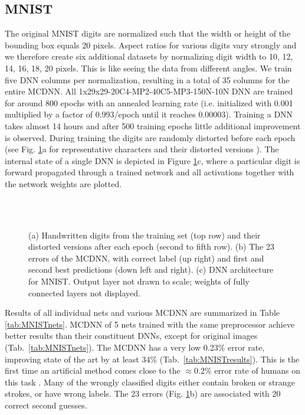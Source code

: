 \documentclass[a4paper]{article}
\begin{document}
\subsection{MNIST}

The original MNIST digits  \cite{lecun:1998} are normalized such that the width or height of the bounding box equals 20 pixels. Aspect ratios for various digits vary strongly and we therefore create six additional datasets by normalizing digit width to 10, 12, 14, 16, 18, 20 pixels. This is like seeing the data from different angles. We train five DNN columns per normalization, resulting in a total of 35 columns for the entire MCDNN. All 1x29x29-20C4-MP2-40C5-MP3-150N-10N DNN are trained for around 800 epochs with an annealed learning rate (i.e. initialized with 0.001 multiplied by a factor of 0.993/epoch until it reaches 0.00003). Training a DNN takes almost 14 hours and after 500 training epochs little additional improvement is observed. During training the digits are randomly distorted before each epoch (see Fig. \ref{fig:MNIST}a for representative characters and their distorted versions \cite{Ciresan:2011a}). The internal state of a single DNN is depicted in Figure \ref{fig:MNIST}c, where a particular digit is forward propagated through a trained network and all activations together with the network weights are plotted.

\begin{figure}[h]
	\centering
	\setlength{\fboxsep}{10pt}
	\setlength{\fboxrule}{0pt}
	\\
	\\
	
\caption{(a) Handwritten digits from the training set (top row) and their distorted versions after each epoch (second to fifth row). (b) The 23 errors of the MCDNN, with correct label (up right) and first and second best predictions (down left and right). (c) DNN architecture for MNIST. Output layer not drawn to scale; weights of fully connected layers not displayed.}
\label{fig:MNIST}
\end{figure}

Results of all individual nets and various MCDNN are summarized in Table \ref{tab:MNISTnets}. MCDNN of 5 nets trained with the same preprocessor achieve better results than their constituent DNNs, except for original images (Tab.~\ref{tab:MNISTnets}). 
The MCDNN has a very low 0.23\% error rate, improving state of the art by at least 34\%  \cite{Ciresan:2010,Ciresan:2011a, RanzatoCVPR:2007} (Tab.~\ref{tab:MNISTresults}). This is the first time an artificial method comes close to the $\approx$0.2\% error rate of humans on this task \cite{lecun-95a}. Many of the wrongly classified digits either contain broken or strange strokes, or have wrong labels. The 23 errors (Fig. \ref{fig:MNIST}b) are associated with 20 correct second guesses.
\end{document}
